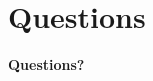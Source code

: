 \section{Questions}
\begin{frame}
	\begin{center}
		{\fontsize{20}{20}\selectfont
			\textbf{Questions?}
		}
	\end{center}
\end{frame}
